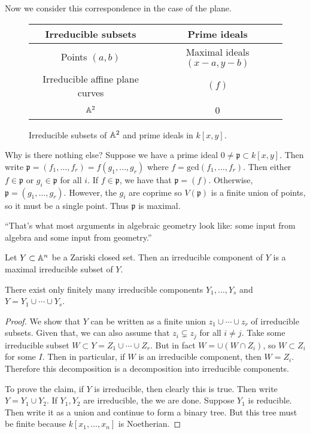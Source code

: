 \documentclass[twoside, 10pt]{article}
\begin{document}
    Now we consider this correspondence in the case of the plane.

    \begin{figure}[H] \begin{center} \begin{tabular}{cc} \toprule Irreducible
    subsets & Prime ideals \\ \midrule Points $(a,b)$ & Maximal ideals $(x-a,
y-b)$ \\ Irreducible affine plane curves & $(f)$ \\ $\mathbb{A}^2$ & 0 \\ \bottomrule
\end{tabular} \end{center} \caption{Irreducible subsets of $\mathbb{A}^2$ and prime
ideals in $k[x,y]$.} \end{figure}

    Why is there nothing else? Suppose we have a prime ideal $0 \neq
    \mathfrak{p} \subset k[x,y]$. Then write $\mathfrak{p} = (f_1, \ldots, f_r)
    = f(g_1, \ldots, g_r)$ where $f = \mathrm{gcd}(f_1, \ldots, f_r)$. Then
    either $f \in \mathfrak{p}$ or $g_i \in \mathfrak{p}$ for all $i$. If $f
    \in \mathfrak{p}$, we have that $\mathfrak{p} = (f)$. Otherwise,
    $\mathfrak{p} = (g_1, \ldots, g_r)$. However, the $g_i$ are coprime so
    $V(\mathfrak{p})$ is a finite union of points, so it must be a single
    point. Thus $\mathfrak{p}$ is maximal.

    ``That's what most arguments in algebraic geometry look like: some input
    from algebra and some input from geometry.''

    \begin{defn} Let $Y \subset \mathbb{A}^n$ be a Zariski
    closed set. Then an irreducible component of $Y$ is a maximal irreducible
subset of $Y$.  \end{defn}

    \begin{lem} There exist only finitely many irreducible components $Y_1,
        \ldots, Y_s$ and $Y = Y_1 \cup \cdots \cup Y_s$.  \begin{proof} We show
            that $Y$ can be written as a finite union $z_1 \cup \cdots \cup
            z_r$ of irreducible subsets. Given that, we can also assume that
            $z_i \subsetneq z_j$ for all $i \neq j$. Take some irreducible
            subset $W \subset Y = Z_1 \cup \cdots \cup Z_r$. But in fact $W =
            \cup (W \cap Z_i)$, so $W \subset Z_i$ for some $I$. Then in
            particular, if $W$ is an irreducible component, then $W = Z_i$.
            Therefore this decomposition is a decomposition into irreducible
            components.

            To prove the claim, if $Y$ is irreducible, then clearly this is
            true. Then write $Y = Y_1 \cup Y_2$. If $Y_1, Y_2$ are irreducible,
            the we are done. Suppose $Y_1$ is reducible. Then write it as a
            union and continue to form a binary tree. But this tree must be
        finite because $k[x_1, \ldots, x_n]$ is Noetherian.  \end{proof}
    \end{lem}
\end{document}
